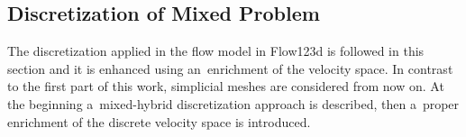 
% 


\subsection{Discretization of Mixed Problem}

The discretization applied in the flow model in Flow123d is followed in this section
and it is enhanced using an~enrichment of the velocity space.
In contrast to the first part of this work, simplicial meshes are considered from now on.
At the beginning a~mixed-hybrid discretization approach is described,
then a~proper enrichment of the discrete velocity space is introduced.


